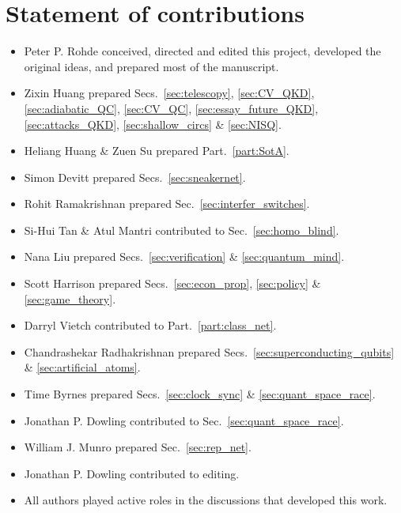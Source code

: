 %
%

\section*{Statement of contributions}

\begin{itemize}
	\item Peter P. Rohde conceived, directed and edited this project, developed the original ideas, and prepared most of the manuscript.
	\item Zixin Huang prepared Secs.~\ref{sec:telescopy}, \ref{sec:CV_QKD}, \ref{sec:adiabatic_QC}, \ref{sec:CV_QC}, \ref{sec:essay_future_QKD}, \ref{sec:attacks_QKD}, \ref{sec:shallow_circs} \& \ref{sec:NISQ}.
	\item Heliang Huang \& Zuen Su prepared Part.~\ref{part:SotA}.
	\item Simon Devitt prepared Secs.~\ref{sec:sneakernet}.
	\item Rohit Ramakrishnan prepared Sec.~\ref{sec:interfer_switches}.
	\item Si-Hui Tan \& Atul Mantri contributed to Sec.~\ref{sec:homo_blind}.
	\item Nana Liu prepared Secs.~\ref{sec:verification} \& \ref{sec:quantum_mind}.
	\item Scott Harrison prepared Secs.~\ref{sec:econ_prop}, \ref{sec:policy} \& \ref{sec:game_theory}.
	\item Darryl Vietch contributed to Part.~\ref{part:class_net}.
	\item Chandrashekar Radhakrishnan prepared Secs.~\ref{sec:superconducting_qubits} \& \ref{sec:artificial_atoms}.
	\item Time Byrnes prepared Secs.~\ref{sec:clock_sync} \& \ref{sec:quant_space_race}.
	\item Jonathan P. Dowling contributed to Sec.~\ref{sec:quant_space_race}.
	\item William J. Munro prepared Sec.~\ref{sec:rep_net}. 
	\item Jonathan P. Dowling contributed to editing.
	\item All authors played active roles in the discussions that developed this work. 
\end{itemize}